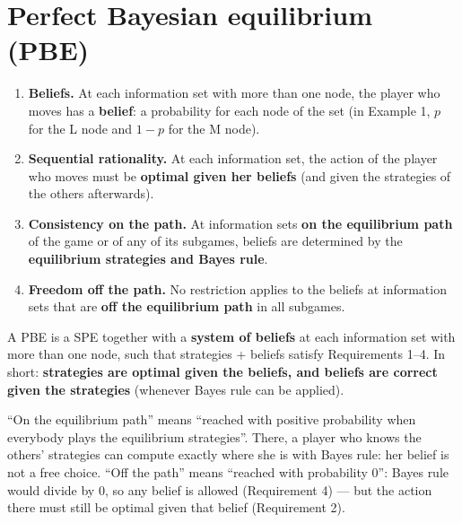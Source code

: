 \documentclass[11pt,a4paper,openany]{book}
\begin{document}
\section{Perfect Bayesian equilibrium (PBE)}

\begin{defnbox}[title=The four requirements of a PBE]
\begin{enumerate}
  \item \textbf{Beliefs.} At each information set with more than one node, the player who
        moves has a \textbf{belief}: a probability for each node of the set (in Example 1,
        $p$ for the L node and $1-p$ for the M node).
  \item \textbf{Sequential rationality.} At each information set, the action of the player
        who moves must be \textbf{optimal given her beliefs} (and given the strategies of the
        others afterwards).
  \item \textbf{Consistency on the path.} At information sets \textbf{on the equilibrium
        path} of the game or of any of its subgames, beliefs are determined by the
        \textbf{equilibrium strategies and Bayes rule}.
  \item \textbf{Freedom off the path.} No restriction applies to the beliefs at information
        sets that are \textbf{off the equilibrium path} in all subgames.
\end{enumerate}
\end{defnbox}

\begin{defnbox}[title=PBE]
A PBE is a SPE together with a \textbf{system of beliefs} at each information set with more
than one node, such that strategies + beliefs satisfy Requirements 1--4. In short:
\textbf{strategies are optimal given the beliefs, and beliefs are correct given the
strategies} (whenever Bayes rule can be applied).
\end{defnbox}

\begin{rembox}[title=In plain words]
``On the equilibrium path'' means ``reached with positive probability when everybody plays
the equilibrium strategies''. There, a player who knows the others' strategies can compute
exactly where she is with Bayes rule: her belief is not a free choice. ``Off the path''
means ``reached with probability 0'': Bayes rule would divide by 0, so any belief is allowed
(Requirement 4) --- but the action there must still be optimal given that belief
(Requirement 2).
\end{rembox}
\end{document}

